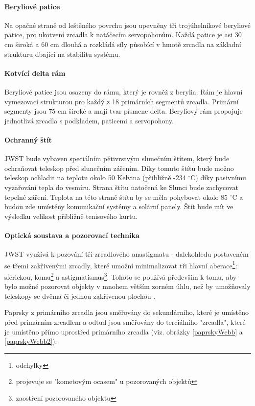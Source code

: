 \documentclass[a4paper,11pt]{article}
\begin{document}
\paragraph{Beryliové patice}
Na opačné straně od leštěného povrchu jsou upevněny tři trojúhelníkové beryliové patice, pro ukotvení zrcadla k natáčecím servopohonům. Každá patice je asi 30 cm široká a 60 cm dlouhá a rozkládá síly působící v hmotě zrcadla na základní strukturu dbající na stabilitu systému.

\paragraph{Kotvící delta rám}
Beryliové patice jsou osazeny do rámu, který je rovněž z berylia. Rám je hlavní vymezovací strukturou pro každý z 18 primárních segmentů zrcadla. Primární segmenty jsou 75 cm široké a mají tvar písmene delta. Beryliový rám propojuje jednotlivá zrcadla s podkladem, paticemi a servopohony.

\paragraph{Ochranný štít}
JWST bude vybaven speciálním pětivrstvým slunečním štítem, který bude ochraňovat teleskop před slunečním zářením. Díky tomuto štítu bude možno teleskop ochladit na teplotu okolo 50 Kelvina (přibližně -234 $^\circ$C) díky pasivnímu vyzařování tepla do vesmíru. Strana štítu natočená ke Slunci bude zachycovat tepelné záření. Teplota na této straně štítu by se měla pohybovat okolo 85 $^\circ$C a budou zde umístěny komunikační systémy a solární panely. Štít bude mít ve výsledku velikost přibližně tenisového kurtu.

\paragraph{Optická soustava a pozorovací technika}
JWST využívá k pozování tří-zrcadlového anastigmatu - dalekohledu postaveném se třemi zakřivenými zrcadly, které umožní minimalizovat tři hlavní aberace\footnote{odchylky}: sférickou, komu\footnote{projevuje se "kometovým ocasem" u pozorovaných objektů} a astigmatismus\footnote{zaostření pozorovaného objektu}. Tohoto se používá především k tomu, aby bylo možné pozorovat objekty v mnohem větším zorném úhlu, než by umožňovaly teleskopy se dvěma či jednou zakřivenou plochou \cite{wikipediaAnastigmat}.

Paprsky z primárního zrcadla jsou směřovány do sekundárního, které je umístěno před primárním zrcadlem a odtud jsou směřovány do terciálního "zrcadla", které je umístěno přímo uprostřed primárního zrcadla (viz. obrázky \ref{paprskyWebb} a \ref{paprskyWebb2}).
\end{document}
